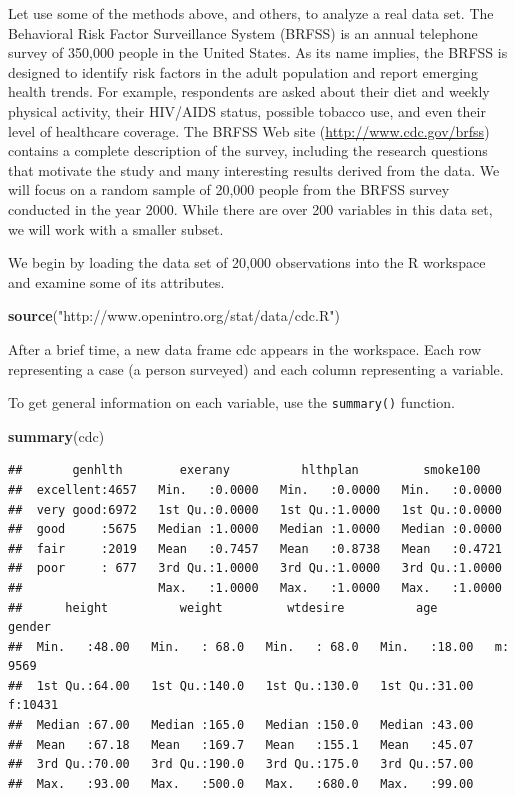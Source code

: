 \documentclass[
]{book}
\newenvironment{Shaded}{\begin{snugshade}}{\end{snugshade}}
\newcommand{\KeywordTok}[1]{\textcolor[rgb]{0.13,0.29,0.53}{\textbf{#1}}}
\newcommand{\NormalTok}[1]{#1}
\newcommand{\StringTok}[1]{\textcolor[rgb]{0.31,0.60,0.02}{#1}}
\begin{document}
Let use some of the methods above, and others, to analyze a real data set. The Behavioral Risk Factor Surveillance System (BRFSS) is an annual telephone survey of 350,000 people in the United States. As its name implies, the BRFSS is designed to identify risk factors in the adult population and report emerging health trends. For example, respondents are asked about their diet and weekly physical activity, their HIV/AIDS status, possible tobacco use, and even their level of healthcare coverage. The BRFSS Web site (\url{http://www.cdc.gov/brfss}) contains a complete description of the survey, including the research questions that motivate the study and many interesting results derived from the data. We will focus on a random sample of 20,000 people from the BRFSS survey conducted in the year 2000. While there are over 200 variables in this data set, we will work with a smaller subset.

We begin by loading the data set of 20,000 observations into the R workspace and examine some of its attributes.

\begin{Shaded}
\begin{Highlighting}[]
\KeywordTok{source}\NormalTok{(}\StringTok{"http://www.openintro.org/stat/data/cdc.R"}\NormalTok{)}
\end{Highlighting}
\end{Shaded}

After a brief time, a new data frame cdc appears in the workspace. Each row representing a case (a person surveyed) and each column representing a variable.

To get general information on each variable, use the \texttt{summary()} function.

\begin{Shaded}
\begin{Highlighting}[]
\KeywordTok{summary}\NormalTok{(cdc)}
\end{Highlighting}
\end{Shaded}

\begin{verbatim}
##       genhlth        exerany          hlthplan         smoke100     
##  excellent:4657   Min.   :0.0000   Min.   :0.0000   Min.   :0.0000  
##  very good:6972   1st Qu.:0.0000   1st Qu.:1.0000   1st Qu.:0.0000  
##  good     :5675   Median :1.0000   Median :1.0000   Median :0.0000  
##  fair     :2019   Mean   :0.7457   Mean   :0.8738   Mean   :0.4721  
##  poor     : 677   3rd Qu.:1.0000   3rd Qu.:1.0000   3rd Qu.:1.0000  
##                   Max.   :1.0000   Max.   :1.0000   Max.   :1.0000  
##      height          weight         wtdesire          age        gender   
##  Min.   :48.00   Min.   : 68.0   Min.   : 68.0   Min.   :18.00   m: 9569  
##  1st Qu.:64.00   1st Qu.:140.0   1st Qu.:130.0   1st Qu.:31.00   f:10431  
##  Median :67.00   Median :165.0   Median :150.0   Median :43.00            
##  Mean   :67.18   Mean   :169.7   Mean   :155.1   Mean   :45.07            
##  3rd Qu.:70.00   3rd Qu.:190.0   3rd Qu.:175.0   3rd Qu.:57.00            
##  Max.   :93.00   Max.   :500.0   Max.   :680.0   Max.   :99.00
\end{verbatim}
\end{document}
